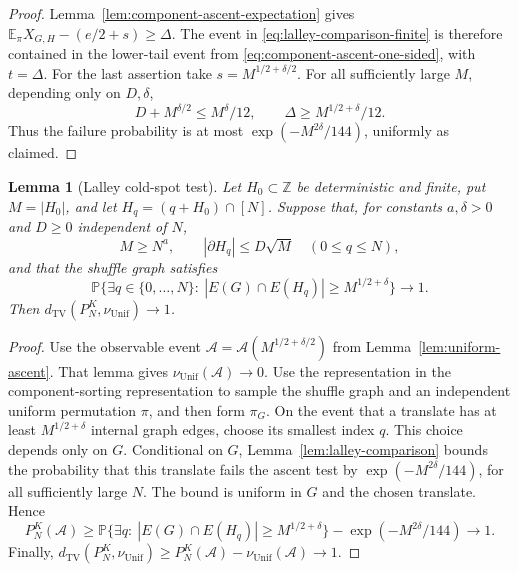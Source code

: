 \documentclass[11pt]{article}
\numberwithin{equation}{section}
\newtheorem{lemma}[theorem]{Lemma}
\theoremstyle{definition}
\theoremstyle{remark}
\newcommand{\E}{\mathbb E}
\newcommand{\Pp}{\mathbb P}
\newcommand{\TV}{\mathrm{TV}}
\newcommand{\Unif}{\mathrm{Unif}}
\newcommand{\dTV}{d_{\TV}}
\newcommand{\nuUnif}{\nu_{\Unif}}
\newcommand{\1}{\mathbf 1}
\begin{document}
\begin{proof}
Lemma~\ref{lem:component-ascent-expectation} gives
\(\E_\pi X_{G,H}-(e/2+s)\ge\Delta\).
The event in \eqref{eq:lalley-comparison-finite} is therefore
contained in the lower-tail event from
\eqref{eq:component-ascent-one-sided}, with \(t=\Delta\).
For the last assertion take \(s=M^{1/2+\delta/2}\).
For all sufficiently large \(M\), depending only on \(D,\delta\),
\[
  D+M^{\delta/2}\le M^\delta/12,
  \qquad
  \Delta\ge M^{1/2+\delta}/12.
\]
Thus the failure probability is at most
\(\exp(-M^{2\delta}/144)\), uniformly as claimed.
\end{proof}

\begin{lemma}[Lalley cold-spot test]
\label{lem:lalley}
Let \(H_0\subset\mathbb Z\) be deterministic and finite, put
\(M=|H_0|\), and let \(H_q=(q+H_0)\cap[N]\).
Suppose that, for constants \(a,\delta>0\) and \(D\ge0\)
independent of \(N\),
\[
  M\ge N^a,\qquad |\partial H_q|\le D\sqrt M
  \quad(0\le q\le N),
\]
and that the shuffle graph satisfies
\[
  \Pp\{\exists q\in\{0,\ldots,N\}:\
         |E(G)\cap E(H_q)|\ge M^{1/2+\delta}\}\longrightarrow1.
\]
Then \(\dTV(P_N^{K},\nuUnif)\longrightarrow1\).
\end{lemma}

\begin{proof}
Use the observable event
\(\mathcal A=\mathcal A(M^{1/2+\delta/2})\) from
Lemma~\ref{lem:uniform-ascent}.  That lemma gives
\(\nuUnif(\mathcal A)\to0\).
Use the representation in the component-sorting representation
to sample the shuffle graph and an independent uniform permutation
\(\pi\), and then form \(\pi_G\).
On the event that a translate has at least
\(M^{1/2+\delta}\) internal graph edges, choose its smallest index
\(q\).  This choice depends only on \(G\).
Conditional on \(G\), Lemma~\ref{lem:lalley-comparison} bounds the
probability that this translate fails the ascent test by
\(\exp(-M^{2\delta}/144)\), for all sufficiently large \(N\).
The bound is uniform in \(G\) and the chosen translate.  Hence
\[
  P_N^K(\mathcal A)
  \ge
  \Pp\{\exists q:\ |E(G)\cap E(H_q)|\ge M^{1/2+\delta}\}
     -\exp(-M^{2\delta}/144)
  \longrightarrow1.
\]
Finally,
\(\dTV(P_N^{K},\nuUnif)
\ge P_N^K(\mathcal A)-\nuUnif(\mathcal A)\to1\).
\end{proof}
\end{document}
